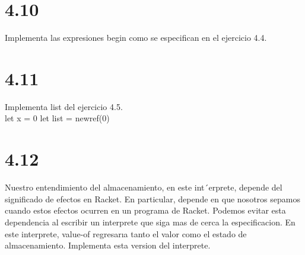\documentclass{article}
\begin{document}
\section{4.10}
Implementa las expresiones begin como se especifican en el ejercicio 4.4.

\section{4.11}
Implementa list del ejercicio 4.5.\\

let x = 0
let list = newref(0)


\section{4.12}
Nuestro entendimiento del almacenamiento, en este int´erprete, depende del significado de efectos en Racket. En particular, depende en que nosotros sepamos cuando estos efectos ocurren en un programa de Racket. Podemos evitar esta dependencia al escribir un interprete que siga mas de cerca la especificacion. En este interprete, value-of regresarıa tanto el valor como el estado de almacenamiento.
Implementa esta version del interprete.
\end{document}
